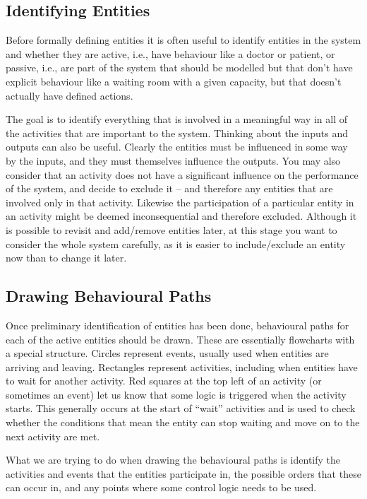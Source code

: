 \documentclass[
  10pt,
  a4paperpaper,
  DIV=11,
  numbers=noendperiod,
  oneside]{scrreprt}
\begin{document}
\subsection{Identifying Entities}\label{identifying-entities}

Before formally defining entities it is often useful to identify
entities in the system and whether they are active, i.e., have behaviour
like a doctor or patient, or passive, i.e., are part of the system that
should be modelled but that don't have explicit behaviour like a waiting
room with a given capacity, but that doesn't actually have defined
actions.

The goal is to identify everything that is involved in a meaningful way
in all of the activities that are important to the system. Thinking
about the inputs and outputs can also be useful. Clearly the entities
must be influenced in some way by the inputs, and they must themselves
influence the outputs. You may also consider that an activity does not
have a significant influence on the performance of the system, and
decide to exclude it -- and therefore any entities that are involved
only in that activity. Likewise the participation of a particular entity
in an activity might be deemed inconsequential and therefore excluded.
Although it is possible to revisit and add/remove entities later, at
this stage you want to consider the whole system carefully, as it is
easier to include/exclude an entity now than to change it later.

\subsection{Drawing Behavioural Paths}\label{drawing-behavioural-paths}

Once preliminary identification of entities has been done, behavioural
paths for each of the active entities should be drawn. These are
essentially flowcharts with a special structure. Circles represent
events, usually used when entities are arriving and leaving. Rectangles
represent activities, including when entities have to wait for another
activity. Red squares at the top left of an activity (or sometimes an
event) let us know that some logic is triggered when the activity
starts. This generally occurs at the start of ``wait'' activities and is
used to check whether the conditions that mean the entity can stop
waiting and move on to the next activity are met.

What we are trying to do when drawing the behavioural paths is identify
the activities and events that the entities participate in, the possible
orders that these can occur in, and any points where some control logic
needs to be used.
\end{document}
